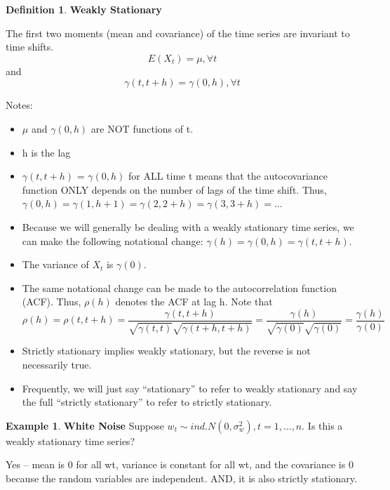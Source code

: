 \documentclass[
]{book}
\theoremstyle{definition}
\newtheorem{definition}{Definition}[chapter]
\theoremstyle{definition}
\newtheorem{example}{Example}[chapter]
\theoremstyle{definition}
\theoremstyle{definition}
\theoremstyle{remark}
\begin{document}
\begin{definition}
\textbf{Weakly Stationary}

The first two moments (mean and covariance) of the time series are invariant to time shifts. \[E(X_t)=\mu, \forall t\] and \[ \gamma(t,t+h)=\gamma(0,h), \forall t\]
\end{definition}

Notes:

\begin{itemize}
\item
  \(\mu\) and \(\gamma(0,h)\) are NOT functions of t.\\
\item
  h is the lag\\
\item
  \(\gamma(t, t+h)\) = \(\gamma(0,h)\) for ALL time t means that the autocovariance function ONLY depends on the number of lags of the time shift. Thus,\(\gamma(0,h) = \gamma(1, h+1) = \gamma(2, 2+h) = \gamma(3, 3+h) = …\)
\item
  Because we will generally be dealing with a weakly stationary time series, we can make the following notational change: \(\gamma(h)=\gamma(0,h)=\gamma(t, t+h).\)\\
\item
  The variance of \(X_t\) is \(\gamma(0)\).
\item
  The same notational change can be made to the autocorrelation function (ACF). Thus, \(\rho(h)\) denotes the ACF at lag h. Note that\[\rho(h)=\rho(t,t+h)=\frac{\gamma(t,t+h)}{\sqrt{\gamma(t,t)}\sqrt{\gamma(t+h,t+h)}}=\frac{\gamma(h)}{\sqrt{\gamma(0)}\sqrt{\gamma(0)}}=\frac{\gamma(h)}{\gamma(0)}\]
\item
  Strictly stationary implies weakly stationary, but the reverse is not necessarily true.\\
\item
  Frequently, we will just say ``stationary'' to refer to weakly stationary and say the full ``strictly stationary'' to refer to strictly stationary.
\end{itemize}

\begin{example}
\textbf{White Noise}
Suppose \(w_t \sim ind. N(0,\sigma^2_w ), t=1,…,n.\) Is this a weakly stationary time series?

Yes -- mean is 0 for all wt, variance is constant for all wt, and the covariance is 0 because the random variables are independent. AND, it is also strictly stationary.
\end{example}
\end{document}
